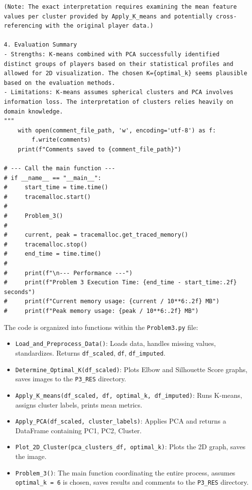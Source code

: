 \documentclass[12pt]{report}
\begin{document}
{{{\begin{lstlisting}
(Note: The exact interpretation requires examining the mean feature values per cluster provided by Apply_K_means and potentially cross-referencing with the original player data.)

4. Evaluation Summary
- Strengths: K-means combined with PCA successfully identified distinct groups of players based on their statistical profiles and allowed for 2D visualization. The chosen K={optimal_k} seems plausible based on the evaluation methods.
- Limitations: K-means assumes spherical clusters and PCA involves information loss. The interpretation of clusters relies heavily on domain knowledge.
"""
    with open(comment_file_path, 'w', encoding='utf-8') as f:
        f.write(comments)
    print(f"Comments saved to {comment_file_path}")

# --- Call the main function ---
# if __name__ == "__main__":
#     start_time = time.time()
#     tracemalloc.start()
#
#     Problem_3()
#
#     current, peak = tracemalloc.get_traced_memory()
#     tracemalloc.stop()
#     end_time = time.time()
#
#     print(f"\n--- Performance ---")
#     print(f"Problem 3 Execution Time: {end_time - start_time:.2f} seconds")
#     print(f"Current memory usage: {current / 10**6:.2f} MB")
#     print(f"Peak memory usage: {peak / 10**6:.2f} MB")
\end{lstlisting}
The code is organized into functions within the \texttt{Problem3.py} file:

\begin{itemize}
  \item \texttt{Load\_and\_Preprocess\_Data()}: Loads data, handles missing values, standardizes. Returns \texttt{df\_scaled}, \texttt{df}, \texttt{df\_imputed}.
  \item \texttt{Determine\_Optimal\_K(df\_scaled)}: Plots Elbow and Silhouette Score graphs, saves images to the \texttt{P3\_RES} directory.
  \item \texttt{Apply\_K\_means(df\_scaled, df, optimal\_k, df\_imputed)}: Runs K-means, assigns cluster labels, prints mean metrics.
  \item \texttt{Apply\_PCA(df\_scaled, cluster\_labels)}: Applies PCA and returns a DataFrame containing PC1, PC2, Cluster.
  \item \texttt{Plot\_2D\_Cluster(pca\_clusters\_df, optimal\_k)}: Plots the 2D graph, saves the image.
  \item \texttt{Problem\_3()}: The main function coordinating the entire process, assumes \texttt{optimal\_k = 6} is chosen, saves results and comments to the \texttt{P3\_RES} directory.
\end{itemize}
}}}
\end{document}
